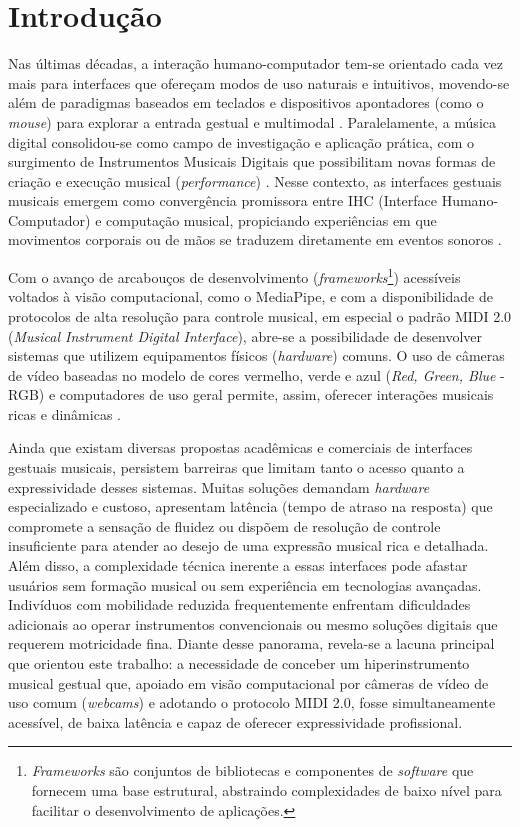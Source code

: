 \chapter{Introdução}
\label{chap:introducao}

Nas últimas décadas, a interação humano-computador tem-se orientado cada vez mais para interfaces que ofereçam modos de uso naturais e intuitivos, movendo-se além de paradigmas baseados em teclados e dispositivos apontadores (como o \textit{mouse}) para explorar a entrada gestual e multimodal \cite{preece2023interaction}. Paralelamente, a música digital consolidou-se como campo de investigação e aplicação prática, com o surgimento de Instrumentos Musicais Digitais que possibilitam novas formas de criação e execução musical (\textit{performance}) \cite{Roads1996, Miranda2002}. Nesse contexto, as interfaces gestuais musicais emergem como convergência promissora entre IHC (Interface Humano-Computador) e computação musical, propiciando experiências em que movimentos corporais ou de mãos se traduzem diretamente em eventos sonoros \cite{wanderley2000gestural}. 

Com o avanço de arcabouços de desenvolvimento (\textit{frameworks}\footnote{\textit{Frameworks} são conjuntos de bibliotecas e componentes de \textit{software} que fornecem uma base estrutural, abstraindo complexidades de baixo nível para facilitar o desenvolvimento de aplicações.}) acessíveis voltados à visão computacional, como o MediaPipe, e com a disponibilidade de protocolos de alta resolução para controle musical, em especial o padrão MIDI 2.0 (\textit{Musical Instrument Digital Interface}), abre-se a possibilidade de desenvolver sistemas que utilizem equipamentos físicos (\textit{hardware}) comuns. O uso de câmeras de vídeo baseadas no modelo de cores vermelho, verde e azul (\textit{Red, Green, Blue} - RGB) e computadores de uso geral permite, assim, oferecer interações musicais ricas e dinâmicas \cite{lugaresi2019mediapipe,midi_org}.

Ainda que existam diversas propostas acadêmicas e comerciais de interfaces gestuais musicais, persistem barreiras que limitam tanto o acesso quanto a expressividade desses sistemas. Muitas soluções demandam \textit{hardware} especializado e custoso, apresentam latência (tempo de atraso na resposta) que compromete a sensação de fluidez ou dispõem de resolução de controle insuficiente para atender ao desejo de uma expressão musical rica e detalhada. Além disso, a complexidade técnica inerente a essas interfaces pode afastar usuários sem formação musical ou sem experiência em tecnologias avançadas. Indivíduos com mobilidade reduzida frequentemente enfrentam dificuldades adicionais ao operar instrumentos convencionais ou mesmo soluções digitais que requerem motricidade fina. Diante desse panorama, revela-se a lacuna principal que orientou este trabalho: a necessidade de conceber um hiperinstrumento musical gestual que, apoiado em visão computacional por câmeras de vídeo de uso comum (\textit{webcams}) e adotando o protocolo MIDI 2.0, fosse simultaneamente acessível, de baixa latência e capaz de oferecer expressividade profissional.

